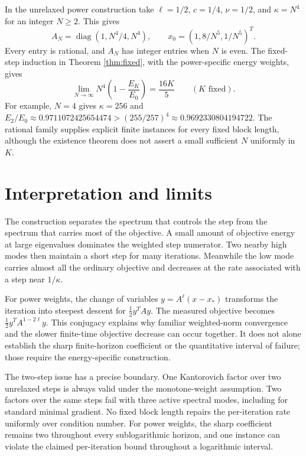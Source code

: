 \documentclass[11pt,a4paper]{article}
\theoremstyle{remark}
\newcommand{\diag}{\operatorname{diag}}
\begin{document}
In the unrelaxed power construction take $\ell=1/2$, $c=1/4$, $\nu=1/2$, and $\kappa=N^4$ for an integer $N\ge2$. This gives
\begin{equation}\label{eq:rationalfamily}
 A_N=\diag(1,N^4/4,N^4),\qquad
 x_0=(1,8/N^5,1/N^5)^T.
\end{equation}
Every entry is rational, and $A_N$ has integer entries when $N$ is even. The fixed-step induction in Theorem \ref{thm:fixed}, with the power-specific energy weights, gives
\begin{equation}\label{eq:rationalasymp}
 \lim_{N\to\infty}N^4\left(1-\frac{E_K}{E_0}\right)=\frac{16K}{5}
 \qquad(K\text{ fixed}).
\end{equation}
For example, $N=4$ gives $\kappa=256$ and $E_2/E_0\approx0.9711072425654474>(255/257)^4\approx0.9692330804194722$. The rational family supplies explicit finite instances for every fixed block length, although the existence theorem does not assert a small sufficient $N$ uniformly in $K$.

\section{Interpretation and limits}

The construction separates the spectrum that controls the step from the spectrum that carries most of the objective. A small amount of objective energy at large eigenvalues dominates the weighted step numerator. Two nearby high modes then maintain a short step for many iterations. Meanwhile the low mode carries almost all the ordinary objective and decreases at the rate associated with a step near $1/\kappa$.

For power weights, the change of variables $y=A^\ell(x-x_*)$ transforms the iteration into steepest descent for $\tfrac12y^TAy$. The measured objective becomes $\tfrac12y^TA^{1-2\ell}y$. This conjugacy explains why familiar weighted-norm convergence and the slower finite-time objective decrease can occur together. It does not alone establish the sharp finite-horizon coefficient or the quantitative interval of failure; those require the energy-specific construction.

The two-step issue has a precise boundary. One Kantorovich factor over two unrelaxed steps is always valid under the monotone-weight assumption. Two factors over the same steps fail with three active spectral modes, including for standard minimal gradient. No fixed block length repairs the per-iteration rate uniformly over condition number. For power weights, the sharp coefficient remains two throughout every sublogarithmic horizon, and one instance can violate the claimed per-iteration bound throughout a logarithmic interval.
\end{document}
